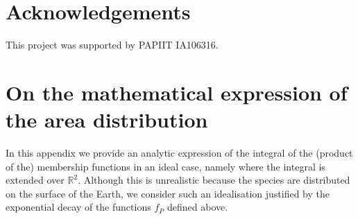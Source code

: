 \documentclass[12pt]{article}
\numberwithin{equation}{section} %
\numberwithin{figure}{section} %
\theoremstyle{definition}
\begin{document}
\section*{Acknowledgements}

This project was supported by PAPIIT IA106316.






\appendix
\section{On the mathematical expression of the area distribution}
In this appendix we provide an analytic expression of the integral of the (product of the) membership functions in an ideal case, namely where the integral is extended over ${\mathbb R}^2$. Although this is unrealistic because the species are distributed on the surface of the Earth, we consider such an idealisation justified by the exponential decay of the functions $f_P$ defined above.
\end{document}

